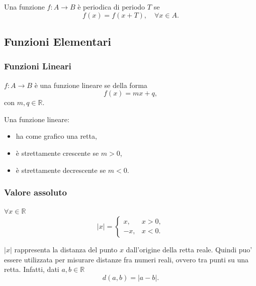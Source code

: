 \begin{definition}
    Una funzione $f\colon A\rightarrow B$ è periodica di periodo $T$ se
    \begin{equation*}
        f(x) = f(x+T),\quad \forall x\in A.
    \end{equation*}
\end{definition}

\subsection{Funzioni Elementari}
\subsubsection{Funzioni Lineari}
\begin{definition}
    $f\colon A\rightarrow B$ è una funzione lineare se della forma
    \begin{equation*}
        f(x) = mx+q,
    \end{equation*}
    con $m,q\in\mathbb R$.
\end{definition}

Una funzione lineare:
\begin{itemize}
    \item ha come grafico una retta,
    \item è strettamente crescente se $m>0$,
    \item è strettamente decrescente se $m<0$.
\end{itemize}

\subsubsection{Valore assoluto}
\begin{definition}
    $\forall x\in\mathbb{R}$
    \begin{equation*}
        |x|=
        \begin{cases}
            x, &x>0,\\
            -x, &x<0.
        \end{cases}
    \end{equation*}
\end{definition}

$|x|$ rappresenta la distanza del punto $x$ dall'origine della retta reale. Quindi puo' essere utilizzata per misurare distanze fra numeri reali, ovvero tra punti su una retta. Infatti, dati $a,b\in\mathbb{R}$
\begin{equation*}
    d(a,b)=|a-b|.
\end{equation*}

